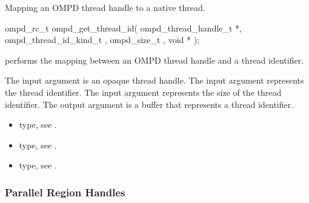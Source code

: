 \label{subsubsubsec:ompd_get_thread_id}
\summary
Mapping an OMPD thread handle to a native thread.

\format
\begin{cspecific}
\begin{ompSyntax}
ompd_rc_t ompd_get_thread_id(
  ompd_thread_handle_t *,
  ompd_thread_id_kind_t ,
  ompd_size_t ,
  void *
);
\end{ompSyntax}
\end{cspecific}

\descr
{} performs the mapping between an OMPD
thread handle and a thread identifier.

\argdesc

The input argument  is an opaque thread handle.
The input argument   represents the thread
identifier. The input argument  represents the size of the 
thread identifier. The output argument  is a buffer that represents a thread identifier.



\crossreferences
\begin{itemize}
	\item {} type, see .
	\item {} type, see .
	\item {} type, see .
\end{itemize}

\subsubsection{Parallel Region Handles}


